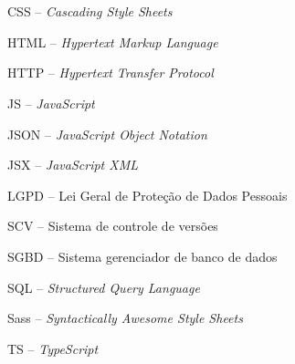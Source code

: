 \section*{} 

CSS		–	\textit{Cascading Style Sheets}

HTML		– 	\textit{Hypertext Markup Language}

HTTP	–  	\textit{Hypertext Transfer Protocol}

JS	–  	\textit{JavaScript}

JSON	–  	\textit{JavaScript Object Notation}

JSX	–  	\textit{JavaScript XML}

LGPD	–  	Lei Geral de Proteção de Dados Pessoais


SCV	–  	Sistema de controle de versões

SGBD	–  	Sistema gerenciador de banco de dados

SQL	–  	\textit{Structured Query Language}

Sass	–  	\textit{Syntactically Awesome Style Sheets}

TS	–  	\textit{TypeScript}










